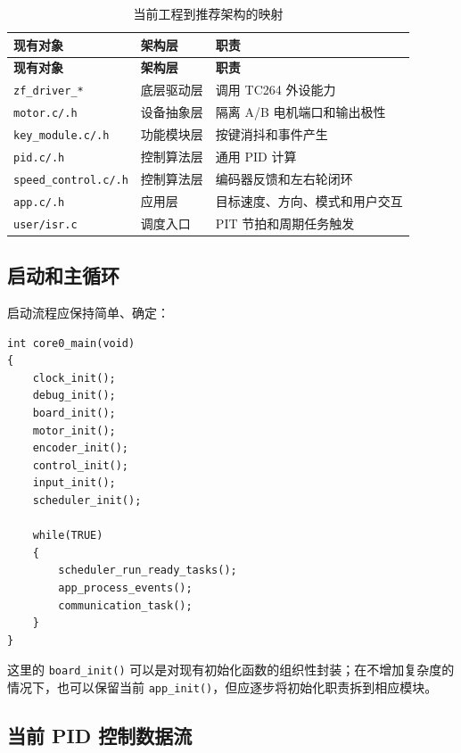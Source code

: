 \documentclass[11pt,a4paper,fontset=fandol]{ctexart}
\begin{document}
\begin{longtable}{p{}p{}p{}}
\caption{当前工程到推荐架构的映射}\\
\toprule
\textbf{现有对象} & \textbf{架构层} & \textbf{职责}\\
\midrule
\endfirsthead
\toprule
\textbf{现有对象} & \textbf{架构层} & \textbf{职责}\\
\midrule
\endhead
\texttt{zf\_driver\_*} & 底层驱动层 & 调用 TC264 外设能力\\
\texttt{motor.c/.h} & 设备抽象层 & 隔离 A/B 电机端口和输出极性\\
\texttt{key\_module.c/.h} & 功能模块层 & 按键消抖和事件产生\\
\texttt{pid.c/.h} & 控制算法层 & 通用 PID 计算\\
\texttt{speed\_control.c/.h} & 控制算法层 & 编码器反馈和左右轮闭环\\
\texttt{app.c/.h} & 应用层 & 目标速度、方向、模式和用户交互\\
\texttt{user/isr.c} & 调度入口 & PIT 节拍和周期任务触发\\
\bottomrule
\end{longtable}

\subsection{启动和主循环}

启动流程应保持简单、确定：

\begin{lstlisting}
int core0_main(void)
{
    clock_init();
    debug_init();
    board_init();
    motor_init();
    encoder_init();
    control_init();
    input_init();
    scheduler_init();

    while(TRUE)
    {
        scheduler_run_ready_tasks();
        app_process_events();
        communication_task();
    }
}
\end{lstlisting}

这里的 \texttt{board\_init()} 可以是对现有初始化函数的组织性封装；在不增加复杂度的情况下，也可以保留当前 \texttt{app\_init()}，但应逐步将初始化职责拆到相应模块。

\subsection{当前 PID 控制数据流}
\end{document}

